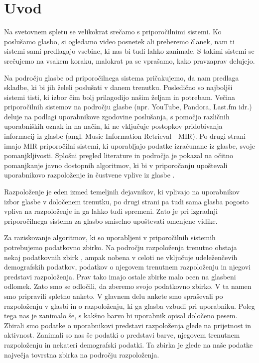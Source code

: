 \documentclass[a4paper, 12pt]{book}
\begin{document}
{%

\chapter{Uvod}

Na svetovnem spletu se velikokrat srečamo s priporočilnimi sistemi. Ko poslušamo glasbo, si ogledamo video posnetek ali preberemo članek, nam ti sistemi sami predlagajo vsebine, ki nas bi tudi lahko zanimale. S takimi sistemi se srečujemo na vsakem koraku, malokrat pa se vprašamo, kako pravzaprav delujejo. 

Na področju glasbe od priporočilnega sistema pričakujemo, da nam predlaga skladbe, ki bi jih želeli poslušati v danem trenutku. Posledično so najboljši sistemi tisti, ki izbor čim bolj prilagodijo našim željam in potrebam. Večina priporočilnih sistemov na področju glasbe (npr. YouTube, Pandora, Last.fm idr.) deluje na podlagi uporabnikove zgodovine poslušanja, s pomočjo različnih uporabniških oznak in na način, ki ne vključuje postopkov pridobivanja informacij iz glasbe (angl. Music Information Retrieval - MIR). Po drugi strani imajo MIR priporočilni sistemi, ki uporabljajo podatke izračunane iz glasbe, svoje pomanjkljivosti. Splošni pregled literature in področja je pokazal na očitno pomanjkanje javno dostopnih algoritmov, ki bi v priporočanju upoštevali uporabnikovo razpoloženje in čustvene vplive iz glasbe \cite{JaeSikLee2006, Song2012, chen2001music}.  

Razpoloženje je eden izmed temeljnih dejavnikov, ki vplivajo na uporabnikov izbor glasbe v določenem trenutku, po drugi strani pa tudi sama glasba pogosto vpliva na razpoloženje in ga lahko tudi spremeni. Zato je pri izgradnji priporočilnega sistema za glasbo smiselno upoštevati omenjene vidike.

Za raziskovanje algoritmov, ki so uporabljeni v priporočilnih sistemih potrebujemo podatkovno zbirko. Na področju razpoloženja trenutno obstaja nekaj podatkovnih zbirk \cite{Eerola2010, schmidt2011modeling, turnbull2008semantic, schuller2010mister, panda2013multi}, ampak nobena v celoti ne vključuje udeleženčevih demografskih podatkov, podatkov o njegovem trenutnem razpoloženju in njegovi predstavi razpoloženja. Prav tako imajo ostale zbirke malo ocen na glasbeni odlomek. Zato smo se odločili, da zberemo svojo podatkovno zbirko. V ta namen smo pripravili spletno anketo. V glavnem delu ankete smo spraševali po razpoloženju v glasbi in o razpoloženju, ki ga glasba vzbudi pri uporabniku. Poleg tega nas je zanimalo še, s kakšno barvo bi uporabnik opisal določeno pesem. Zbirali smo podatke o uporabnikovi predstavi razpoloženja glede na prijetnost in aktivnost. Zanimali so nas še podatki o predstavi barve, njegovem trenutnem razpoloženju in nekateri demografski podatki. Ta zbirka je glede na naše podatke največja tovrstna zbirka na področju razpoloženja.

}
\end{document}

